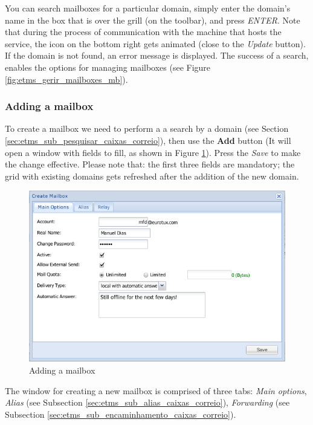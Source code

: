 You can search mailboxes for a particular domain, simply enter the domain's name in the box that is over the grill (on the toolbar), and press \textit{ENTER}. Note that during the process of communication with the machine that hosts the service, the icon on the bottom right gets animated (close to the \textit{Update} button). If the domain is not found, an error message is displayed. The success of a search, enables the options for managing mailboxes (see Figure \ref{fig:etms_gerir_mailboxes_mb}).

\subsubsection{Adding a mailbox}
\label{sec:etms_sub_criar_caixas_correio}
To create a mailbox we need to perform a a search by a domain (see Section \ref{sec:etms_sub_pesquisar_caixas_correio}), then use the \textbf{Add} button (It will open a window with fields to fill, as shown in Figure \ref{fig:etms_criar_mailbox}). Press the \textit{Save} to make the change effective. Please note that: the first three fields are mandatory; the grid with existing domains gets refreshed after the addition of the new domain.

\begin{figure}[H]
    \begin{center}
    \includegraphics[scale=0.45]{screenshots/etms/etms_criar_mailbox.png}
    \caption{Adding a mailbox}
    \label{fig:etms_criar_mailbox}
    \end{center}
\end{figure}

The window for creating a new mailbox is comprised of three tabs: \textit{Main options}, \textit{Alias} ​​(see Subsection \ref{sec:etms_sub_alias_caixas_correio}), \textit{Forwarding} (see Subsection \ref{sec:etms_sub_encaminhamento_caixas_correio}).

